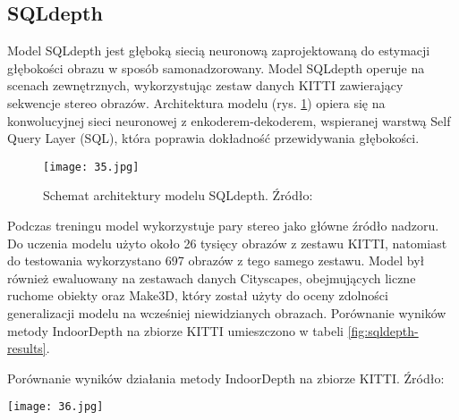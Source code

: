 \subsection{SQLdepth}
Model SQLdepth \cite{wang2023sqldepth} jest głęboką siecią neuronową zaprojektowaną do estymacji głębokości obrazu w sposób samonadzorowany. Model SQLdepth operuje na scenach zewnętrznych, wykorzystując zestaw danych KITTI zawierający sekwencje stereo obrazów. Architektura modelu (rys. \ref{fig:sqldepth-architecture}) opiera się na konwolucyjnej sieci neuronowej z enkoderem-dekoderem, wspieranej warstwą Self Query Layer (SQL), która poprawia dokładność przewidywania głębokości.
\begin{figure}[H]
    \centering
    \texttt{[image: 35.jpg]}
    \caption{Schemat architektury modelu SQLdepth. Źródło: \cite{wang2023sqldepth}}
    \label{fig:sqldepth-architecture}
\end{figure}
Podczas treningu model wykorzystuje pary stereo jako główne źródło nadzoru. Do uczenia modelu użyto około 26 tysięcy obrazów z zestawu KITTI, natomiast do testowania wykorzystano 697 obrazów z tego samego zestawu. Model był również ewaluowany na zestawach danych Cityscapes, obejmujących liczne ruchome obiekty oraz Make3D, który został użyty do oceny zdolności generalizacji modelu na wcześniej niewidzianych obrazach. Porównanie wyników metody IndoorDepth na zbiorze KITTI umieszczono w tabeli \ref{fig:sqldepth-results}.
\begin{table}[H]
    \centering
    \caption{Porównanie wyników działania metody IndoorDepth na zbiorze KITTI. Źródło: \cite{wang2023sqldepth}}
    \texttt{[image: 36.jpg]}
    \label{fig:sqldepth-results}
\end{table}


